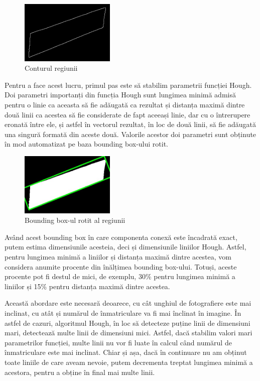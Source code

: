\documentclass[a4paper,12pt]{report}
\begin{document}
\begin{figure}[h]
    \centering
    \includegraphics[width=0.4\textwidth]{images/edges.jpg}
    \caption{Conturul regiunii}
\end{figure}
\FloatBarrier

Pentru a face acest lucru, primul pas este să stabilim parametrii funcției Hough. Doi parametri importanți din funcția Hough sunt lungimea minimă admisă pentru o linie ca aceasta să fie adăugată ca rezultat și distanța maximă dintre două linii ca acestea să fie considerate de fapt aceeași linie, dar cu o întrerupere eronată între ele, și astfel în vectorul rezultat, în loc de două linii, să fie adăugată una singură formată din aceste două. Valorile acestor doi parametri sunt obținute în mod automatizat pe baza bounding box-ului rotit.

\begin{figure}[h]
    \centering
    \includegraphics[width=0.4\textwidth]{images/rotated_rect.jpg}
    \caption{Bounding box-ul rotit al regiunii}
\end{figure}
\FloatBarrier

Având acest bounding box în care componenta conexă este încadrată exact, putem estima dimensiunile acesteia, deci și dimensiunile liniilor Hough. Astfel, pentru lungimea minimă a liniilor și distanța maximă dintre acestea, vom considera anumite procente din înălțimea bounding box-ului. Totuși, aceste procente pot fi destul de mici, de exemplu, 30\% pentru lungimea minimă a liniilor și 15\% pentru distanța maximă dintre acestea.

Această abordare este necesară deoarece, cu cât unghiul de fotografiere este mai inclinat, cu atât și numărul de înmatriculare va fi mai înclinat în imagine. În astfel de cazuri, algoritmul Hough, în loc să detecteze puține linii de dimensiuni mari, detectează multe linii de dimensiuni mici. Astfel, dacă stabilim valori mari parametrilor funcției, multe linii nu vor fi luate în calcul când numărul de înmatriculare este mai inclinat. Chiar și așa, dacă în continuare nu am obținut toate liniile de care aveam nevoie, putem decrementa treptat lungimea minimă a acestora, pentru a obține în final mai multe linii.
\end{document}
